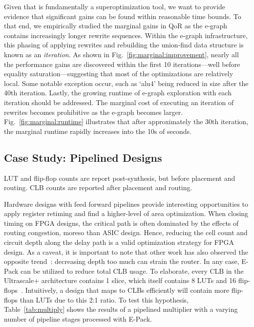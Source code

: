 Given that \shortname{} is fundamentally a superoptimization tool, we want to
provide evidence that significant gains can be found within reasonable time
bounds. To that end, we empirically studied the marginal gains in QoR as the
e-graph contains increasingly longer rewrite sequences. Within the e-graph
infrastructure, this phasing of applying rewrites and rebuilding the union-find
data structure is known as an \textit{iteration}. As shown in
Fig.~\ref{fig:marginal:improvement}, nearly all the performance gains are
discovered within the first 10 iterations---well before equality
saturation---suggesting that most of the optimizations are relatively local.
Some notable exception occur, such as `alu4' being reduced in size after the
40th iteration. Lastly, the growing runtime of e-graph exploration with each
iteration should be addressed. The marginal cost of executing an iteration of
rewrites becomes prohibitive as the e-graph becomes larger.
Fig.~\ref{fig:marginal:runtime} illustrates that after approximately the 30th
iteration, the marginal runtime rapidly increases into the 10s of seconds.

\subsection{Case Study: Pipelined Designs}\label{sec:results:retiming}
\begin{table}[t]
    \centering
    \caption{LUT and flip-flop counts are report post-synthesis, but before placement and routing. CLB counts are reported after placement and routing.}\label{tab:multiply}
\end{table}

Hardware designs with feed forward pipelines provide interesting opportunities
to apply register retiming and find a higher-level of area optimization. When
closing timing on FPGA designs, the critical path is often dominated by the
effects of routing congestion, moreso than ASIC design. Hence, reducing the
cell count and circuit depth along the delay path is a valid optimization
strategy for FPGA design. As a caveat, it is important to note that other work
has also observed the opposite trend~\cite{academicfpga}: decreasing depth too
much can strain the router. In any case, E-Pack can be utilized to reduce total
CLB usage. To elaborate, every CLB in the Ultrascale+ architecture contains 1
slice, which itself contains 8 LUTs and 16 flip-flops~\cite{ug574}.
Intuitively, a design that maps to CLBs efficiently will contain more
flip-flops than LUTs due to this 2:1 ratio. To test this hypothesis,
Table~\ref{tab:multiply} shows the results of a pipelined multiplier with a
varying number of pipeline stages processed with E-Pack.

